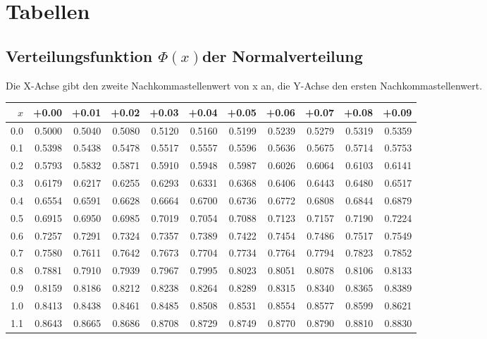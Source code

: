 
\section{Tabellen}

\subsection{Verteilungsfunktion $\Phi(x)$der Normalverteilung}
\label{Verteilungsfunktion der Normalverteilung}

\begin{center}
    \vspace{0.25cm}
    Die X-Achse gibt den zweite Nachkommastellenwert von x an, die Y-Achse den ersten Nachkommastellenwert.\\
    \vspace{0.25cm}
    \small
    \begin{tabular}{|r|rrrrrrrrrr|}
        \hline
        $x$&+0.00&+0.01&+0.02&+0.03&+0.04&+0.05&+0.06&+0.07&+0.08&+0.09\\
        \hline
        0.0&0.5000&0.5040&0.5080&0.5120&0.5160&0.5199&0.5239&0.5279&0.5319&0.5359\\
        0.1&0.5398&0.5438&0.5478&0.5517&0.5557&0.5596&0.5636&0.5675&0.5714&0.5753\\
        0.2&0.5793&0.5832&0.5871&0.5910&0.5948&0.5987&0.6026&0.6064&0.6103&0.6141\\
        0.3&0.6179&0.6217&0.6255&0.6293&0.6331&0.6368&0.6406&0.6443&0.6480&0.6517\\
        0.4&0.6554&0.6591&0.6628&0.6664&0.6700&0.6736&0.6772&0.6808&0.6844&0.6879\\
        0.5&0.6915&0.6950&0.6985&0.7019&0.7054&0.7088&0.7123&0.7157&0.7190&0.7224\\
        0.6&0.7257&0.7291&0.7324&0.7357&0.7389&0.7422&0.7454&0.7486&0.7517&0.7549\\
        0.7&0.7580&0.7611&0.7642&0.7673&0.7704&0.7734&0.7764&0.7794&0.7823&0.7852\\
        0.8&0.7881&0.7910&0.7939&0.7967&0.7995&0.8023&0.8051&0.8078&0.8106&0.8133\\
        0.9&0.8159&0.8186&0.8212&0.8238&0.8264&0.8289&0.8315&0.8340&0.8365&0.8389\\
        1.0&0.8413&0.8438&0.8461&0.8485&0.8508&0.8531&0.8554&0.8577&0.8599&0.8621\\
        1.1&0.8643&0.8665&0.8686&0.8708&0.8729&0.8749&0.8770&0.8790&0.8810&0.8830\\

\end{tabular}
\end{center}

